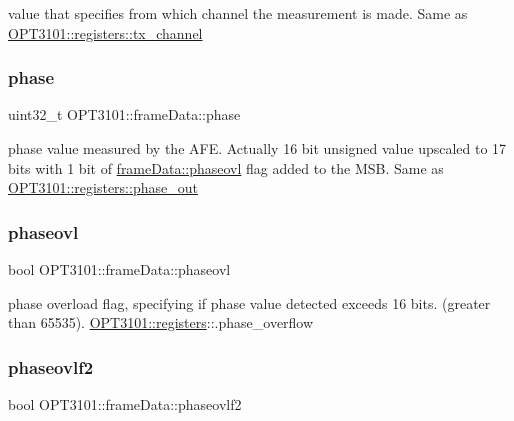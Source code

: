 value that specifies from which channel the measurement is made. Same as \mbox{\hyperlink{class_o_p_t3101_1_1registers_a53518f25f00a5926fda5f0d37ad82fcb}{O\+P\+T3101\+::registers\+::tx\+\_\+channel}} 

\mbox{\label{class_o_p_t3101_1_1frame_data_af8661d11405953dc378ad4d7cb0f2db6}} 
\subsubsection{\texorpdfstring{phase}{phase}}
{\footnotesize\ttfamily uint32\+\_\+t O\+P\+T3101\+::frame\+Data\+::phase}



phase value measured by the A\+FE. Actually 16 bit unsigned value upscaled to 17 bits with 1 bit of \mbox{\hyperlink{class_o_p_t3101_1_1frame_data_ad1c9f22f2b5a22ce7977334a5ae8ef54}{frame\+Data\+::phaseovl}} flag added to the M\+SB. Same as \mbox{\hyperlink{class_o_p_t3101_1_1registers_a0b410cb503df506724a4b6a1da49ce1e}{O\+P\+T3101\+::registers\+::phase\+\_\+out}} 

\mbox{\label{class_o_p_t3101_1_1frame_data_ad1c9f22f2b5a22ce7977334a5ae8ef54}} 
\subsubsection{\texorpdfstring{phaseovl}{phaseovl}}
{\footnotesize\ttfamily bool O\+P\+T3101\+::frame\+Data\+::phaseovl}



phase overload flag, specifying if phase value detected exceeds 16 bits. (greater than 65535). \mbox{\hyperlink{class_o_p_t3101_1_1registers}{O\+P\+T3101\+::registers}}\+:\+:.phase\+\_\+overflow 

\mbox{\label{class_o_p_t3101_1_1frame_data_afa41c051623d5431aa7c9d27bdb32f6c}} 
\subsubsection{\texorpdfstring{phaseovlf2}{phaseovlf2}}
{\footnotesize\ttfamily bool O\+P\+T3101\+::frame\+Data\+::phaseovlf2}



